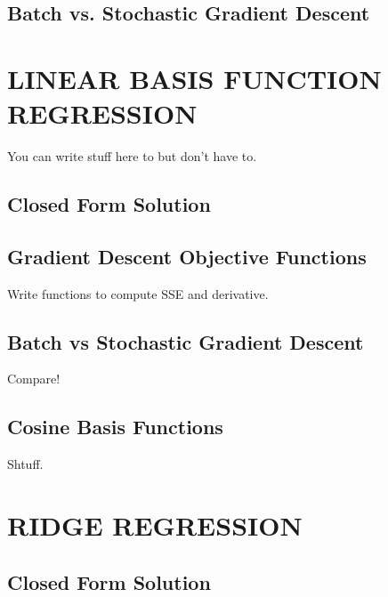 \documentclass[a4paper,twoside]{article}
\begin{document}
\subsection{Batch vs. Stochastic Gradient Descent}



\section{\uppercase{Linear Basis Function Regression}}

You can write stuff here to but don't have to.

\subsection{Closed Form Solution}

\subsection{Gradient Descent Objective Functions}

Write functions to compute SSE and derivative.

\subsection{Batch vs Stochastic Gradient Descent}

Compare!

\subsection{Cosine Basis Functions}

Shtuff.


\section{\uppercase{Ridge Regression}}

\subsection{Closed Form Solution}
\end{document}
